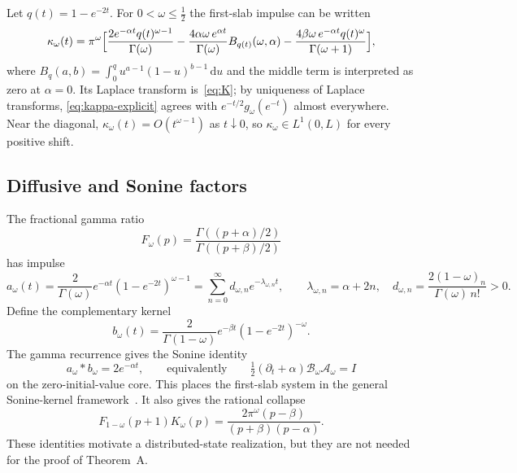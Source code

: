 \documentclass[11pt,a4paper]{article}
\newcommand{\dd}{\,\mathrm d}
\theoremstyle{plain}
\theoremstyle{definition}
\numberwithin{equation}{section}
\begin{document}
Let $q(t)=1-e^{-2t}$. For $0<\omega\le\tfrac12$ the first-slab impulse can be
written
\begin{equation}\label{eq:kappa-explicit}
\kappa_\omega(t)=\pi^\omega\Bigl[
\frac{2e^{-\alpha t}q(t)^{\omega-1}}{\Gamma(\omega)}
-\frac{4\alpha\omega\,e^{\alpha t}}{\Gamma(\omega)}B_{q(t)}(\omega,\alpha)
-\frac{4\beta\omega\,e^{-\alpha t}q(t)^{\omega}}{\Gamma(\omega+1)}
\Bigr],
\end{equation}
where $B_q(a,b)=\int_0^q u^{a-1}(1-u)^{b-1}\dd u$ and the middle term is
interpreted as zero at $\alpha=0$. Its Laplace transform is~\eqref{eq:K};
by uniqueness of Laplace transforms, \eqref{eq:kappa-explicit} agrees with
$e^{-t/2}g_\omega(e^{-t})$ almost everywhere. Near the diagonal,
$\kappa_\omega(t)=O(t^{\omega-1})$ as $t\downarrow0$, so
$\kappa_\omega\in L^1(0,L)$ for every positive shift.

\subsection{Diffusive and Sonine factors}

The fractional gamma ratio
\begin{equation}
F_\omega(p)=\frac{\Gamma((p+\alpha)/2)}{\Gamma((p+\beta)/2)}
\end{equation}
has impulse
\begin{equation}
a_\omega(t)=\frac{2}{\Gamma(\omega)}e^{-\alpha t}(1-e^{-2t})^{\omega-1}
=\sum_{n=0}^\infty d_{\omega,n}e^{-\lambda_{\omega,n}t},
\qquad
\lambda_{\omega,n}=\alpha+2n,\quad
d_{\omega,n}=\frac{2(1-\omega)_n}{\Gamma(\omega)\,n!}>0 .
\end{equation}
Define the complementary kernel
\begin{equation}
b_\omega(t)=\frac{2}{\Gamma(1-\omega)}e^{-\beta t}(1-e^{-2t})^{-\omega}.
\end{equation}
The gamma recurrence gives the Sonine identity
\begin{equation}
a_\omega*b_\omega=2e^{-\alpha t},
\qquad\text{equivalently}\qquad
\tfrac12(\partial_t+\alpha)\mathcal B_\omega\mathcal A_\omega=I
\end{equation}
on the zero-initial-value core. This places the first-slab system in the
general Sonine-kernel framework~\cite{Luchko2021}. It also gives the rational
collapse
\begin{equation}
F_{1-\omega}(p+1)K_\omega(p)=\frac{2\pi^\omega(p-\beta)}{(p+\beta)(p-\alpha)} .
\end{equation}
These identities motivate a distributed-state realization, but they are not
needed for the proof of Theorem~A.
\end{document}
